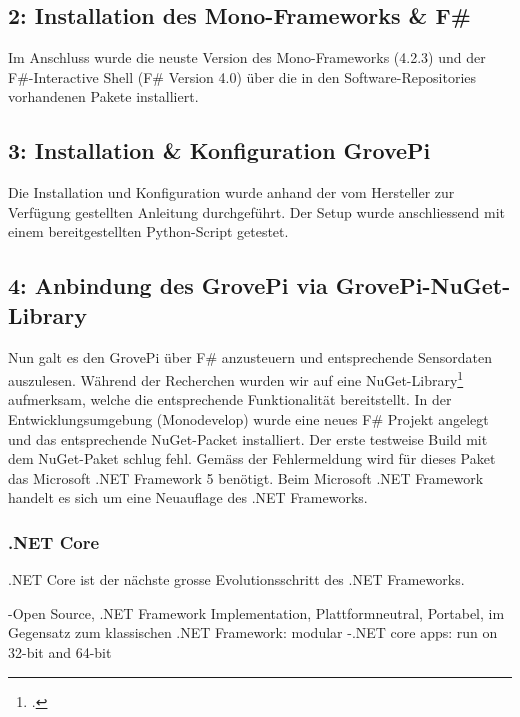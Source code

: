 \subsection{2: Installation des Mono-Frameworks \& F\#}
Im Anschluss wurde die neuste Version des Mono-Frameworks (4.2.3) und der F\#-Interactive Shell (F\# Version 4.0) über die in den Software-Repositories vorhandenen Pakete installiert.

\subsection{3: Installation \& Konfiguration GrovePi}
Die Installation und Konfiguration wurde anhand der vom Hersteller zur Verfügung gestellten Anleitung durchgeführt. Der Setup wurde anschliessend mit einem bereitgestellten Python-Script getestet.


\subsection{4: Anbindung des GrovePi via GrovePi-NuGet-Library}
Nun galt es den GrovePi über F\# anzusteuern und entsprechende Sensordaten auszulesen. Während der Recherchen wurden wir auf eine NuGet-Library\footcite{NuGet_GrovePi_2016-04-24} aufmerksam, welche die entsprechende Funktionalität bereitstellt. In der Entwicklungsumgebung (Monodevelop) wurde eine neues F\# Projekt angelegt und das entsprechende NuGet-Packet installiert. Der erste testweise Build mit dem NuGet-Paket schlug fehl. Gemäss der Fehlermeldung wird für dieses Paket das Microsoft .NET Framework 5 benötigt. Beim Microsoft .NET Framework handelt es sich um eine Neuauflage des .NET Frameworks.

\subsubsection{.NET Core}

.NET Core ist der nächste grosse Evolutionsschritt des .NET Frameworks.

-Open Source, .NET Framework Implementation, Plattformneutral, Portabel, im Gegensatz zum klassischen .NET Framework: modular
-.NET core apps: run on 32-bit and 64-bit


